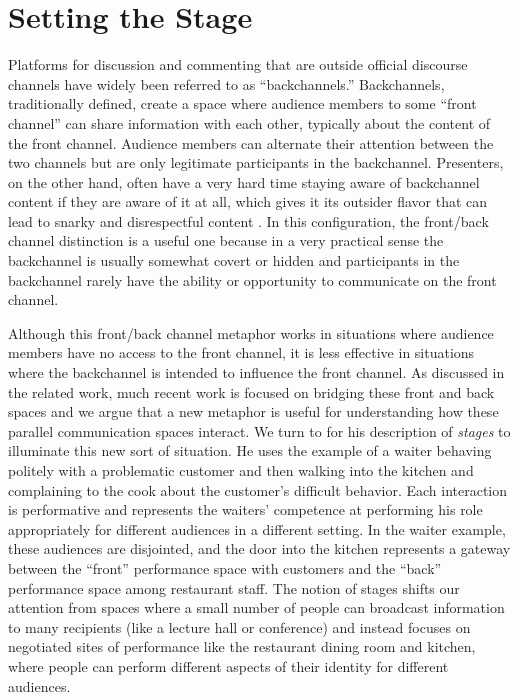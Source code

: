 \section {Setting the Stage}

Platforms for discussion and commenting that are outside official discourse channels have widely been referred to as ``backchannels.''  Backchannels, traditionally defined, create a space where audience members to some ``front channel'' can share information with each other, typically about the content of the front channel. Audience members can alternate their attention between the two channels but are only legitimate participants in the backchannel. Presenters, on the other hand, often have a very hard time staying aware of backchannel content if they are aware of it at all, which gives it its outsider flavor that can lead to snarky and disrespectful content \citep{boyd:Yo36SNyj}. In this configuration, the front/back channel distinction is a useful one because in a very practical sense the backchannel is usually somewhat covert or hidden and participants in the backchannel rarely have the ability or opportunity to communicate on the front channel.


Although this front/back channel metaphor works in situations where audience members have no access to the front channel, it is less effective in situations where the backchannel is intended to influence the front channel. As discussed in the related work, much recent work is focused on bridging these front and back spaces and we argue that a new metaphor is useful for understanding how these parallel communication spaces interact. We turn to \citet{goffman_presentation_1959} for his description of \emph{stages} to illuminate this new sort of situation. He uses the example of a waiter behaving politely with a problematic customer and then walking into the kitchen and complaining to the cook about the customer's difficult behavior. Each interaction is performative and represents the waiters' competence at performing his role appropriately for different audiences in a different setting. In the waiter example, these audiences are disjointed, and the door into the kitchen represents a gateway between the ``front'' performance space with customers and the ``back'' performance space among restaurant staff. The notion of stages shifts our attention from spaces where a small number of people can broadcast information to many recipients (like a lecture hall or conference) and instead focuses on negotiated sites of performance like the restaurant dining room and kitchen, where people can perform different aspects of their identity for different audiences.

